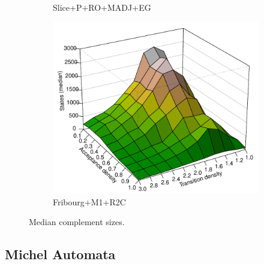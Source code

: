 \begin{figure}[ht]
\begin{subfigure}[t]{\perspwidth\textwidth}
  \caption{Slice+P+RO+MADJ+EG}
  \end{subfigure}
  \hfill
  \begin{subfigure}[t]{\perspwidth\textwidth}
  \centering
  \includegraphics[width=\textwidth]{figures/r/external/goal/s.median.Fribourg+M1+R2C.pdf}
  \caption{Fribourg+M1+R2C}
  \end{subfigure}
  \hfill
\caption{Median complement sizes.}
\end{figure}



\subsection{Michel Automata}


